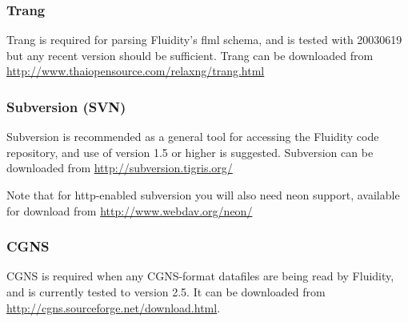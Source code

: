 \subsubsection{Trang}
\label{sec:required_libraries_supporting_trang}

Trang is required for parsing Fluidity's flml schema, and is tested with
20030619 but any recent version should be sufficient. Trang can be downloaded
from \url{http://www.thaiopensource.com/relaxng/trang.html}

\subsubsection{Subversion (SVN)}
\label{sec:required_libraries_supportingsvn}

Subversion is recommended as a general tool for accessing the Fluidity code
repository, and use of version 1.5 or higher is suggested. Subversion can be
downloaded from \url{http://subversion.tigris.org/}

Note that for http-enabled subversion you will also need neon support,
available for download from \url{http://www.webdav.org/neon/}

\subsubsection{CGNS}
\label{sec:required_libraries_supporting_cgns}

CGNS is required when any CGNS-format datafiles are being read by Fluidity, and
is currently tested to version 2.5. It can be downloaded from 
\url{http://cgns.sourceforge.net/download.html}.

